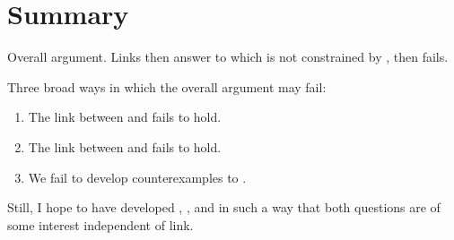 
\section*{Summary}

\begin{note}
  Overall argument.
  Links then answer to \qWhyV{} which is not constrained by \qHowV{}, then \issueInclusion{} fails.

  Three broad ways in which the overall argument may fail:
  \begin{enumerate}[label=\arabic*., ref=(\arabic*), noitemsep]
  \item
    The link between \qWhyV{} and \qWhy{} fails to hold.
  \item
    The link between \qHowV{} and \qHow{} fails to hold.
  \item
    We fail to develop counterexamples to \issueConstraint{}.
  \end{enumerate}

  Still, I hope to have developed \qWhyV{}, \qHowV{}, and \issueConstraint{} in such a way that both questions are of some interest independent of link.
\end{note}







